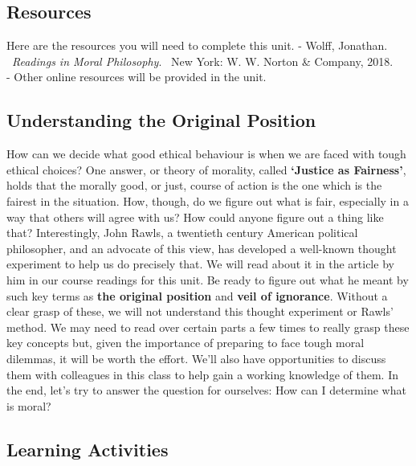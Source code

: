 \documentclass[
]{book}
\begin{document}
\hypertarget{resources-3}{%
\subsection*{Resources}\label{resources-3}}

Here are the resources you will need to complete this unit.
- Wolff, Jonathan. ~\emph{Readings in Moral Philosophy}. ~New York: W. W. Norton \& Company, 2018.\\
- Other online resources will be provided in the unit.

\hypertarget{understanding-the-original-position}{%
\subsection*{Understanding the Original Position}\label{understanding-the-original-position}}

How can we decide what good ethical behaviour is when we are faced with tough
ethical choices? One answer, or theory of morality, called \textbf{`Justice as
Fairness'}, holds that the morally good, or just, course of action is the one
which is the fairest in the situation. How, though, do we figure out what is
fair, especially in a way that others will agree with us? How could anyone
figure out a thing like that?
Interestingly, John Rawls, a twentieth century American political philosopher, and an advocate of this view, has developed a well-known thought experiment to help us do precisely that. We will read about it in the article by him in our course readings for this unit. Be ready to figure out what he meant by such key terms as \textbf{the original position} and \textbf{veil of ignorance}. Without a clear grasp of these, we will not understand this thought experiment or Rawls' method.
We may need to read over certain parts a few times to really grasp these key concepts but, given the importance of preparing to face tough moral dilemmas, it will be worth the effort. We'll also have opportunities to discuss them with colleagues in this class to help gain a working knowledge of them. In the end, let's try to answer the question for ourselves: How can I determine what is moral?

\hypertarget{learning-activities-8}{%
\subsection*{Learning Activities}\label{learning-activities-8}}
\end{document}
